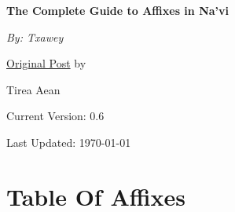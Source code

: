 \documentclass[12pt,a4paper,titlepage, dvipsnames]{book}
\begin{document}
\begin{titlepage}
	\centering
	\vspace*{3.5cm}
	\vspace*{1.5cm}

	{\huge\bfseries The Complete Guide to Affixes in Na'vi\par}
	\vspace{2cm}
	{\Large\itshape By: Txawey\par}
	\vfill
	\href{https://forum.learnnavi.org/prefixes-infixes-and-suffixes/easy-guide-to-navi-prefixes-infixes-and-suffixes-ii/}{Original Post} by\par
	Tirea Aean

	\vspace{2cm}
	\vfill
\scriptsize Current Version: 0.6\par
\scriptsize Last Updated: \today\par
\end{titlepage}
\tableofcontents



\chapter{Table Of Affixes}


\printindex
\end{document}
